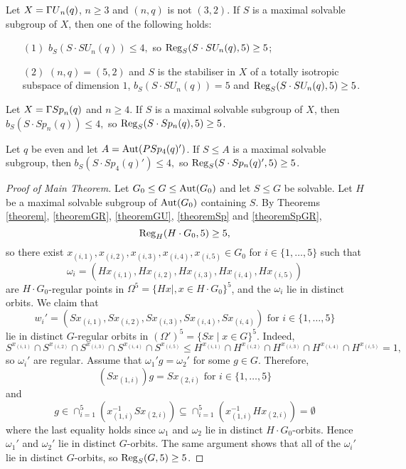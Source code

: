 \begin{mainthB}\label{theoremGU}
Let $X={{\Gamma U}}_n(q)$, $n \ge 3$ and $(n,q)$ is not  $(3,2).$ If $S$ is a maximal solvable subgroup of $X$, 
 then one of the following holds:
\begin{enumerate}
\item[$(1)$]  $b_S(S \cdot SU_n(q)) \le 4,$ so $\mathrm{Reg}_S(S \cdot SU_n(q),5)\ge 5$;
\item[$(2)$]   $(n,q)=(5,2)$ and $S$ is the stabiliser in $X$ of a totally isotropic subspace of dimension $1$, $b_S(S \cdot SU_n(q)) =5$ and $\mathrm{Reg}_S(S \cdot SU_n(q),5)\ge 5$. 
\end{enumerate}
\end{mainthB}

\begin{mainthC}\label{theoremSp}
Let $X={{\Gamma Sp}}_n(q)$ and  $n \ge 4$. If $S$ is a maximal solvable subgroup of $X$, 
 then  $b_S(S \cdot Sp_n(q)) \le 4,$ so $\mathrm{Reg}_S(S \cdot Sp_n(q),5)\ge 5$. 
\end{mainthC}

\begin{mainthC}\label{theoremSpGR}
Let $q$ be even and let ${A}=\mathrm{Aut}(PSp_4(q)')$. If ${S} \le {A}$ is a maximal solvable subgroup, then $b_{{S}}({S} \cdot Sp_4(q)') \le 4,$ so $\mathrm{Reg}_S(S \cdot Sp_n(q)',5)\ge 5$.
\end{mainthC}



\begin{proof}[Proof of Main Theorem]
Let $G_0 \le G \le \mathrm{Aut} (G_0)$ and let $S\le G$ be solvable. Let $H$ be a maximal solvable subgroup of $  \mathrm{Aut}(G_0)$ containing $S$. By Theorems \ref{theorem}, \ref{theoremGR}, \ref{theoremGU},  \ref{theoremSp} and \ref{theoremSpGR},
$$\mathrm{Reg}_H(H \cdot G_0,5)\ge 5,$$
so there exist $x_{(i,1)},x_{(i,2)},x_{(i,3)},x_{(i,4)},x_{(i,5)} \in G_0$ for $i \in\{1, \ldots, 5\}$ such that
$$\omega_i=(Hx_{(i,1)},Hx_{(i,2)},Hx_{(i,3)},Hx_{(i,4)},Hx_{(i,5)})$$ 
are $H \cdot G_0$-regular points   in $\Omega^5=\{Hx \mid, x \in H \cdot G_0 \}^5$, and the $\omega_i$ lie in distinct orbits. 
We claim that $$w_i'=(Sx_{(i,1)},Sx_{(i,2)},Sx_{(i,3)},Sx_{(i,4)},Sx_{(i,4)}) \text{ for } i \in \{1, \ldots, 5\}$$ lie in distinct $G$-regular orbits in $(\Omega')^5=\{Sx \mid x \in G\}^5.$ Indeed, $$S^{x_{(i,1)}} \cap S^{x_{(i,2)}} \cap S^{x_{(i,3)}} \cap S^{x_{(i,4)}} \cap S^{x_{(i,5)}} \le H^{x_{(i,1)}} \cap H^{x_{(i,2)}} \cap H^{x_{(i,3)}} \cap H^{x_{(i,4)}} \cap H^{x_{(i,5)}}=1,$$ so $\omega_i'$ are regular. Assume that $\omega_1' g = \omega_2'$ for some $g \in G.$ Therefore,
$$(Sx_{(1,i)})g=Sx_{(2,i)} \text{ for } i \in \{1, \ldots, 5\}$$
and 
$$g \in \cap_{i=1}^5 (x_{(1,i)}^{-1}S x_{(2,i)}) \subseteq \cap_{i=1}^5 (x_{(1,i)}^{-1}H x_{(2,i)})= \emptyset$$
where the last equality holds since $\omega_1$ and $\omega_2$ lie in distinct $H \cdot G_0$-orbits. Hence $\omega_1'$ and $\omega_2'$ lie in distinct $G$-orbits. The same argument shows that all of the $\omega_i'$ lie in distinct $G$-orbits, so $\mathrm{Reg}_S(G,5)\ge 5$.
\end{proof}


